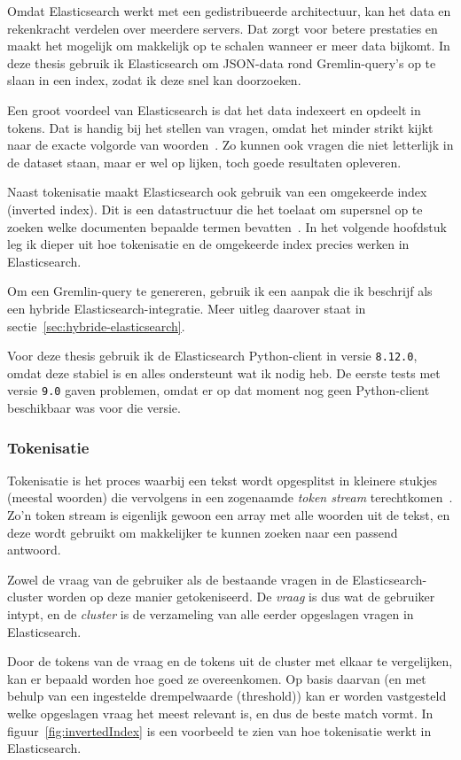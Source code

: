 Omdat Elasticsearch werkt met een gedistribueerde architectuur, kan het data en rekenkracht verdelen over meerdere servers.
Dat zorgt voor betere prestaties en maakt het mogelijk om makkelijk op te schalen wanneer er meer data bijkomt.
In deze thesis gebruik ik Elasticsearch om JSON-data rond Gremlin-query's op te slaan in een index, zodat ik deze snel kan doorzoeken.

Een groot voordeel van Elasticsearch is dat het data indexeert en opdeelt in tokens.
Dat is handig bij het stellen van vragen, omdat het minder strikt kijkt naar de exacte volgorde van woorden~\textcite{Oers2025}.
Zo kunnen ook vragen die niet letterlijk in de dataset staan, maar er wel op lijken, toch goede resultaten opleveren.

Naast tokenisatie maakt Elasticsearch ook gebruik van een omgekeerde index (inverted index).
Dit is een datastructuur die het toelaat om supersnel op te zoeken welke documenten bepaalde termen bevatten~\autocite{Brimley2023}.
In het volgende hoofdstuk leg ik dieper uit hoe tokenisatie en de omgekeerde index precies werken in Elasticsearch.

Om een Gremlin-query te genereren, gebruik ik een aanpak die ik beschrijf als een hybride Elasticsearch-integratie.
Meer uitleg daarover staat in sectie~\ref{sec:hybride-elasticsearch}.

Voor deze thesis gebruik ik de Elasticsearch Python-client in versie \texttt{8.12.0}, omdat deze stabiel is en alles ondersteunt wat ik nodig heb.
De eerste tests met versie \texttt{9.0} gaven problemen, omdat er op dat moment nog geen Python-client beschikbaar was voor die versie.


\subsubsection{Tokenisatie}
Tokenisatie is het proces waarbij een tekst wordt opgesplitst in kleinere stukjes (meestal woorden) die vervolgens in een zogenaamde \emph{token stream} terechtkomen~\autocite{Elastic}.
Zo'n token stream is eigenlijk gewoon een array met alle woorden uit de tekst, en deze wordt gebruikt om makkelijker te kunnen zoeken naar een passend antwoord.

Zowel de vraag van de gebruiker als de bestaande vragen in de Elasticsearch-cluster worden op deze manier getokeniseerd.
De \emph{vraag} is dus wat de gebruiker intypt, en de \emph{cluster} is de verzameling van alle eerder opgeslagen vragen in Elasticsearch.

Door de tokens van de vraag en de tokens uit de cluster met elkaar te vergelijken, kan er bepaald worden hoe goed ze overeenkomen.
Op basis daarvan (en met behulp van een ingestelde drempelwaarde (threshold)) kan er worden vastgesteld welke opgeslagen vraag het meest relevant is, en dus de beste match vormt.
In figuur~\ref{fig:invertedIndex} is een voorbeeld te zien van hoe tokenisatie werkt in Elasticsearch.

